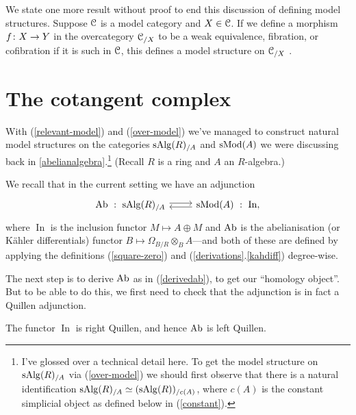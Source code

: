 \begin{nothing}
  \label{over-model}
  We state one more result without proof to end this discussion of
  defining model structures. Suppose $\mathcal{C}$ is a model category and $X
  \in \mathcal{C}$. If we define a morphism $f \colon X \to Y$ in the overcategory
  $\mathcal{C}_{/X}$ to be a weak equivalence, fibration, or cofibration if it
  is such in $\mathcal{C}$, this defines a model structure on $\mathcal{C}_{/X}$
  \cite{nlab-modelover}.
\end{nothing}


\section{The cotangent complex}

With (\ref{relevant-model}) and (\ref{over-model}) we've managed to
construct natural model structures on the categories $\mathrm{s}\mathrm{Alg}(R)_{/A}$
and $\mathrm{s}\mathrm{Mod}(A)$ we were discussing back in \textsection
\ref{abelianalgebra}.\footnote{I've glossed over a technical detail
  here. To get the model structure on $\mathrm{s}\mathrm{Alg}(R)_{/A}$ via
  (\ref{over-model}) we should first observe that there is a natural
  identification $\mathrm{s}\mathrm{Alg}(R)_{/A} \simeq (\mathrm{s}\mathrm{Alg}(R))_{/c(A)}$, where
  $c(A)$ is the constant simplicial object as defined below in
  (\ref{constant}).} (Recall $R$ is a ring and $A$ an $R$-algebra.)

\newcommand{\In}{\operatorname{In}}

\begin{notation}
  We recall that in the current setting we have an adjunction
  \[
  \begin{tikzcd}
    \Ab \ : \ \s\Alg(R)_{/A} \rar[yshift=2pt] & \s\Mod(A) \ :\ \In,
    \lar[yshift=-2pt]
  \end{tikzcd}
  \]
  where $\In$ is the inclusion functor $M \mapsto A \oplus M$ and
  $\operatorname{Ab}$ is the abelianisation (or K\"ahler differentials) functor $B
  \mapsto \Omega_{B/R} \otimes_B A$---and both of these are defined by
  applying the definitions (\ref{square-zero}) and
  (\ref{derivations}.\ref{kahdiff}) degree-wise.
\end{notation}

The next step is to derive $\operatorname{Ab}$ as in (\ref{derivedab}), to get our
``homology object''. But to be able to do this, we first need to check
that the adjunction is in fact a Quillen adjunction.

\begin{lemma}
  The functor $\In$ is right Quillen, and hence $\operatorname{Ab}$ is left
  Quillen.
\end{lemma}

